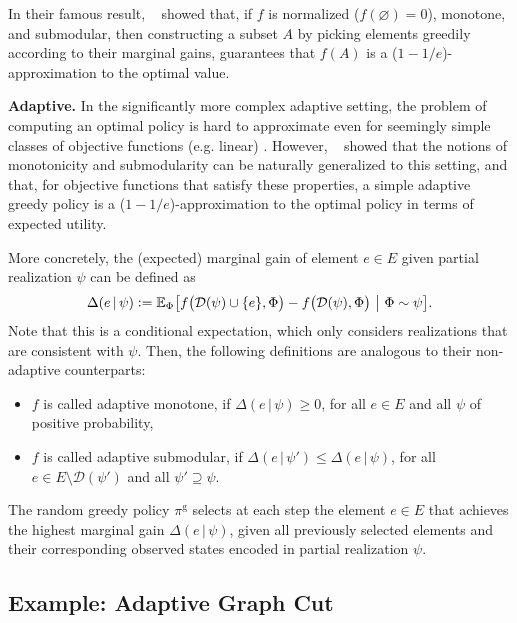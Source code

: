 \documentclass{article}
\newcommand{\dom}{\mathcal{D}}
\newcommand{\defeq}{\vcentcolon=}
\newcommand{\mmid}{\,\vert\,}
\newcommand{\D}[2]{\Delta(#1\mmid#2)}
\newcommand{\pigr}{\pi^{\textrm{g}}}
\newcommand{\citet}[1]{\citeauthor{#1}~\shortcite{#1}}
\renewcommand{\paragraph}[1]{\vspace{0.3em}\noindent\textbf{#1.}\makebox[0.5em]{}}
\begin{document}
In their famous result, \citet{nemhauser78} showed that, if $f$ is normalized ($f(\varnothing) = 0$), monotone, and submodular, then constructing a subset $A$ by picking elements greedily according to their marginal gains, guarantees that $f(A)$ is a ($1 - 1/e$)-approximation to the optimal value.

\paragraph{Adaptive}
In the significantly more complex adaptive setting, the problem of computing an optimal policy is hard to approximate even for seemingly simple classes of objective functions (e.g. linear) \cite{golovin11}.
However, \citet{golovin11} showed that the notions of monotonicity and submodularity can be naturally generalized to this setting, and that, for objective functions that satisfy these properties, a simple adaptive greedy policy is a ($1 - 1/e$)-approximation to the optimal policy in terms of expected utility.

More concretely, the (expected) marginal gain of element $e \in E$ given partial realization $\psi$ can be defined as
\begin{align*}
  \D{e}{\psi} \defeq \E[\Phi]{f\big(\mathcal{D}(\psi) \cup \{e\}, \Phi\big) - f\big(\dom(\psi), \Phi\big)}[\Phi \sim \psi].
\end{align*}
Note that this is a conditional expectation, which only considers realizations that are consistent with $\psi$.
Then, the following definitions are analogous to their non-adaptive counterparts:
\begin{itemize}
\item $f$ is called adaptive monotone, if $\D{e}{\psi} \geq 0$, for all $e \in E$ and all $\psi$ of positive probability,
\item $f$ is called adaptive submodular, if $\D{e}{\psi'} \leq \D{e}{\psi}$, for all $e \in E \setminus \dom(\psi')$ and all $\psi' \supseteq \psi$.
\end{itemize}
The random greedy policy $\pigr$ selects at each step the element $e \in E$ that achieves the highest marginal gain $\D{e}{\psi}$, given all previously selected elements and their corresponding observed states encoded in partial realization $\psi$.

\subsection{Example: Adaptive Graph Cut}
\end{document}
